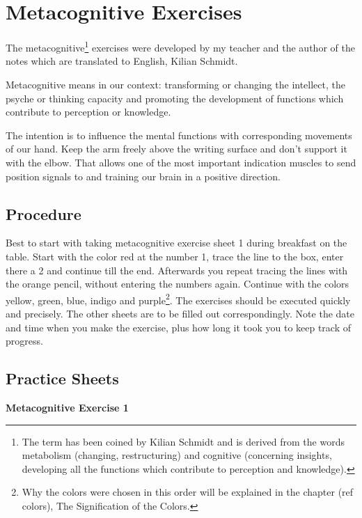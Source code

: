 \documentclass[../main.tex]{subfiles}
\begin{document}
  \chapter{Metacognitive Exercises}\label{metacognitive}
  The metacognitive\footnote{The term has been coined by Kilian Schmidt and is derived from the words metabolism (changing, restructuring) and cognitive (concerning insights, developing all the functions which contribute to perception and knowledge).} exercises were developed by my teacher and the author of the notes which are translated to English, Kilian Schmidt.


Metacognitive means in our context: {transforming} or changing the {intellect}, the
psyche or {thinking capacity}  and promoting the development of
functions which contribute to perception or knowledge.



The intention is to {influence the mental functions} with corresponding {movements of our hand}.
Keep the arm freely above the writing surface and don't support it with the elbow. {That allows one of the most important indication muscles to  send position signals to and training our brain in a positive direction.}

\section{Procedure}

Best to start with taking metacognitive exercise sheet 1 during breakfast on the table. Start with the color red at the number 1, trace the line to the box, enter there a 2 and continue till the end. Afterwards you repeat tracing the lines with the orange pencil, without entering the numbers again. Continue with the colors yellow, green, blue, indigo and purple\footnote{Why the colors were chosen in this order will be explained in the chapter (ref colors), The Signification of the Colors.}. The exercises should be executed quickly and precisely. The other sheets are to be filled out correspondingly. Note the date and time when you make the exercise, plus how long it took you to keep track of progress.


\newpage
\section{Practice Sheets}

\noindent \textbf{Metacognitive Exercise 1}
\end{document}
